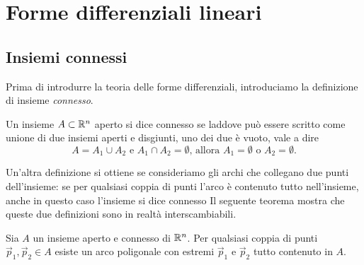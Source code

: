 \chapter{Forme differenziali lineari}
\section{Insiemi connessi}
Prima di introdurre la teoria delle forme differenziali, introduciamo la definizione di insieme \emph{connesso}.
\begin{definizione} \label{d:connesso}
	Un insieme $A\subset\mathbb{R}^n$ aperto si dice connesso se laddove può essere scritto come unione di due insiemi aperti e disgiunti, uno dei due è vuoto, vale a dire
	\begin{equation*}
		A=A_1\cup A_2\text{ e }A_1\cap A_2=\emptyset\text{, allora }A_1=\emptyset\text{ o }A_2=\emptyset.
	\end{equation*}
\end{definizione}
Un'altra definizione si ottiene se consideriamo gli archi che collegano due punti dell'insieme: se per qualsiasi coppia di punti l'arco è contenuto tutto nell'insieme, anche in questo caso l'insieme si dice connesso
Il seguente teorema mostra che queste due definizioni sono in realtà interscambiabili.
\begin{teorema} \label{t:connessione-per-archi}
	Sia $A$ un insieme aperto e connesso di $\mathbb{R}^n$.
	Per qualsiasi coppia di punti $\vec p_1,\vec p_2\in A$ esiste un arco poligonale con estremi $\vec p_1$ e $\vec p_2$ tutto contenuto in $A$.
\end{teorema}
